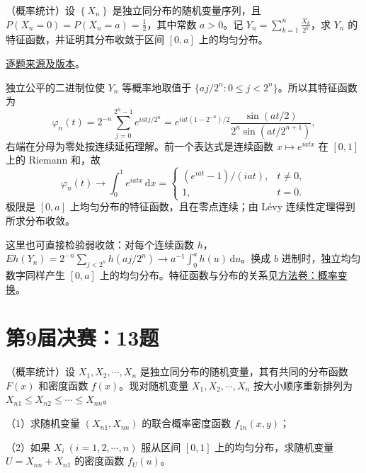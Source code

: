\documentclass[UTF8,12pt,a4paper,fontset=fandol]{ctexbook}
\begin{document}
\begin{example}[公开题解转录]\label{q:fin08-hi:13}

（概率统计）设 $\left\{X_{n}\right\}$ 是独立同分布的随机变量序列，且 $P\left(X_{n}=0\right)=P\left(X_{n}=a\right)=\frac{1}{2}$，其中常数 $a>0$。记 $Y_{n}=\sum_{k=1}^{n}\frac{X_{k}}{2^{k}}$，求 $Y_{n}$ 的特征函数，并证明其分布收敛于区间 $[0,a]$ 上的均匀分布。

\end{example}

\href{https://github.com/lzxcr/cmc-mathematics/blob/64916fa1fdbc3e444a652eca204d5669058ee321/src/problems/finals/08/15.md}{逐题来源及版本}。

\begin{solve}

独立公平的二进制位使 $Y_n$ 等概率地取值于 $\{aj/2^n:0\leq j<2^n\}$。所以其特征函数为
\[
\varphi_n(t)=2^{-n}\sum_{j=0}^{2^n-1}e^{iatj/2^n}
=e^{iat(1-2^{-n})/2}\frac{\sin(at/2)}{2^n\sin(at/2^{n+1})},
\]
右端在分母为零处按连续延拓理解。前一个表达式是连续函数 $x\mapsto e^{iatx}$ 在 $[0,1]$ 上的 Riemann 和，故
\[
\varphi_n(t)\longrightarrow\int_0^1e^{iatx}\,\mathrm dx
=\begin{cases}(e^{iat}-1)/(iat),&t\ne0,\\1,&t=0.\end{cases}
\]
极限是 $[0,a]$ 上均匀分布的特征函数，且在零点连续；由 Lévy 连续性定理得到所求分布收敛。

\end{solve}

\begin{remark}[方法与条件]

这里也可直接检验弱收敛：对每个连续函数 $h$，$Eh(Y_n)=2^{-n}\sum_{j<2^n}h(aj/2^n)\to a^{-1}\int_0^ah(u)\,\mathrm du$。换成 $b$ 进制时，独立均匀数字同样产生 $[0,a]$ 上的均匀分布。特征函数与分布的关系见\hyperref[app:probability-transforms]{方法卷：概率变换}。

\end{remark}

\section{第9届决赛：13题}\label{pr:fin09-hi:13}

\begin{example}[公开题解转录]\label{q:fin09-hi:13}

（概率统计）设 $X_1,X_2,\cdots,X_n$ 是独立同分布的随机变量，其有共同的分布函数 $F(x)$ 和密度函数 $f(x)$。现对随机变量 $X_1,X_2,\cdots,X_n$ 按大小顺序重新排列为 $X_{n1} \leq X_{n2} \leq \cdots \leq X_{nn}$。

（1）求随机变量 $(X_{n1},X_{nn})$ 的联合概率密度函数 $f_{1n}(x,y)$；

（2）如果 $X_i\ (i = 1,2,\cdots,n)$ 服从区间 $[0,1]$ 上的均匀分布，求随机变量 $U = X_{nn} + X_{n1}$ 的密度函数 $f_U(u)$。

\end{example}
\end{document}
